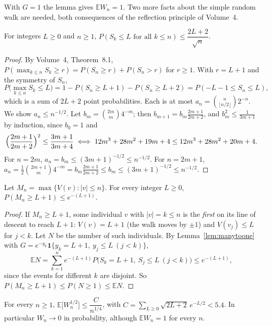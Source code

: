 With $G=1$ the lemma gives $\mathbb EW_n=1$. Two more facts about the simple random walk are needed, both consequences of the reflection principle of Volume~4.

\begin{lemma}\label{lem:ballotbound}
For integers $L\ge0$ and $n\ge1$, $P(S_k\le L\text{ for all }k\le n)\le\dfrac{2L+2}{\sqrt n}$.
\end{lemma}

\begin{proof}
By Volume~4, Theorem~8.1, $P(\max_{k\le n}S_k\ge r)=P(S_n\ge r)+P(S_n>r)$ for $r\ge1$. With $r=L+1$ and the symmetry of $S_n$,
\[
P\bigl(\max_{k\le n}S_k\le L\bigr)=1-P(S_n\ge L+1)-P(S_n\ge L+2)=P(-L-1\le S_n\le L),
\]
which is a sum of $2L+2$ point probabilities. Each is at most $a_n=\binom n{\lfloor n/2\rfloor}2^{-n}$. We show $a_n\le n^{-1/2}$. Let $b_m=\binom{2m}m4^{-m}$; then $b_{m+1}=b_m\frac{2m+1}{2m+2}$, and $b_m^2\le\frac1{3m+1}$ by induction, since $b_0=1$ and
\[
\Bigl(\frac{2m+1}{2m+2}\Bigr)^2\le\frac{3m+1}{3m+4}\iff12m^3+28m^2+19m+4\le12m^3+28m^2+20m+4.
\]
For $n=2m$, $a_n=b_m\le(3m+1)^{-1/2}\le n^{-1/2}$. For $n=2m+1$, $a_n=\frac12\binom{2m+1}m4^{-m}=b_m\frac{2m+1}{2m+2}\le b_m\le(3m+1)^{-1/2}\le n^{-1/2}$.
\end{proof}

\begin{lemma}\label{lem:nohigh}
Let $M_n=\max\{V(v):|v|\le n\}$. For every integer $L\ge0$, $P(M_n\ge L+1)\le e^{-(L+1)}$.
\end{lemma}

\begin{proof}
If $M_n\ge L+1$, some individual $v$ with $|v|=k\le n$ is the \emph{first} on its line of descent to reach $L+1$: $V(v)=L+1$ (the walk moves by $\pm1$) and $V(v_j)\le L$ for $j<k$. Let $N$ be the number of such individuals. By Lemma~\ref{lem:manytoone} with $G=e^{-y_k}\mathbf 1\{y_k=L+1,\ y_j\le L\ (j<k)\}$,
\[
\mathbb EN=\sum_{k=1}^n e^{-(L+1)}P\bigl(S_k=L+1,\ S_j\le L\ (j<k)\bigr)\le e^{-(L+1)},
\]
since the events for different $k$ are disjoint. So $P(M_n\ge L+1)\le P(N\ge1)\le\mathbb EN$.
\end{proof}

\begin{theorem}\label{thm:halfmoment}
For every $n\ge1$, $\mathbb E\bigl[W_n^{1/2}\bigr]\le\dfrac{C}{n^{1/4}}$, with $C=\sum_{L\ge0}\sqrt{2L+2}\,e^{-L/2}<5.4$. In particular $W_n\to0$ in probability, although $\mathbb EW_n=1$ for every $n$.
\end{theorem}

